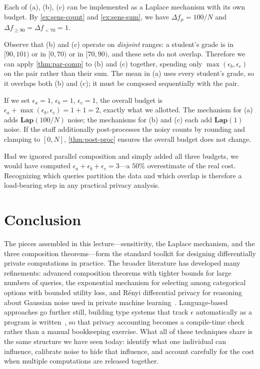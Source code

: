 \documentclass[11pt]{article}
\newcommand{\lap}{\mathbf{Lap}}
\newcommand{\sens}{\Delta}
\begin{document}
Each of (a), (b), (c) can be implemented as a Laplace mechanism with its own
budget.  By \autoref{ex:sens-count} and \autoref{ex:sens-sum}, we have
$\sens f_\mu = 100/N$ and $\sens f_{\geq 90} = \sens f_{<70} = 1$.

Observe that (b) and (c) operate on \emph{disjoint} ranges: a student's
grade is in $[90, 101)$ or in $[0, 70)$ or in $[70, 90)$, and these sets do
not overlap.  Therefore we can apply \autoref{thm:par-comp} to (b) and (c)
together, spending only $\max(\epsilon_b, \epsilon_c)$ on the pair rather
than their sum.  The mean in (a) uses every student's grade, so it overlaps
both (b) and (c); it must be composed sequentially with the pair.

If we set $\epsilon_a = 1$, $\epsilon_b = 1$, $\epsilon_c = 1$, the overall
budget is $\epsilon_a + \max(\epsilon_b, \epsilon_c) = 1 + 1 = 2$, exactly
what we allotted.  The mechanism for (a) adds $\lap(100/N)$ noise; the
mechanisms for (b) and (c) each add $\lap(1)$ noise.  If the staff
additionally post-processes the noisy counts by rounding and clamping to
$[0, N]$, \autoref{thm:post-proc} ensures the overall budget does not
change.

Had we ignored parallel composition and simply added all three budgets, we
would have computed $\epsilon_a + \epsilon_b + \epsilon_c = 3$---a $50\%$
overestimate of the real cost.  Recognizing which queries partition the data
and which overlap is therefore a load-bearing step in any practical privacy
analysis.

\section{Conclusion}

The pieces assembled in this lecture---sensitivity, the Laplace mechanism,
and the three composition theorems---form the standard toolkit for
designing differentially private computations in practice.  The broader
literature has developed many refinements: advanced composition theorems
with tighter bounds for large numbers of queries, the exponential mechanism
for selecting among categorical options with bounded utility loss, and
R\'enyi differential privacy for reasoning about Gaussian noise used in
private machine learning~\citep{Dwork14fttcs}.  Language-based approaches go
further still, building type systems that track $\epsilon$ automatically as
a program is written~\citep{Reed10icfp,Gaboardi13popl}, so that privacy
accounting becomes a compile-time check rather than a manual
bookkeeping exercise.  What all of these techniques share is the same
structure we have seen today: identify what one individual can influence,
calibrate noise to hide that influence, and account carefully for the cost
when multiple computations are released together.
\end{document}
